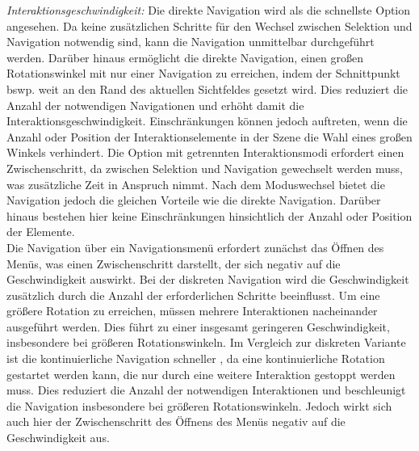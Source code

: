 \textit{Interaktionsgeschwindigkeit:}
Die direkte Navigation wird als die schnellste Option angesehen. Da keine zusätzlichen Schritte für den Wechsel zwischen Selektion und Navigation notwendig sind, kann die Navigation unmittelbar durchgeführt werden. Darüber hinaus ermöglicht die direkte Navigation, einen großen Rotationswinkel mit nur einer Navigation zu erreichen, indem der Schnittpunkt bswp. weit an den Rand des aktuellen Sichtfeldes gesetzt wird. Dies reduziert die Anzahl der notwendigen Navigationen und erhöht damit die Interaktionsgeschwindigkeit. Einschränkungen können jedoch auftreten, wenn die Anzahl oder Position der Interaktionselemente in der Szene die Wahl eines großen Winkels verhindert. Die Option mit getrennten Interaktionsmodi erfordert einen Zwischenschritt, da zwischen Selektion und Navigation gewechselt werden muss, was zusätzliche Zeit in Anspruch nimmt. Nach dem Moduswechsel bietet die Navigation jedoch die gleichen Vorteile wie die direkte Navigation. Darüber hinaus bestehen hier keine Einschränkungen hinsichtlich der Anzahl oder Position der Elemente. \\
Die Navigation über ein Navigationsmenü erfordert zunächst das Öffnen des Menüs, was einen Zwischenschritt darstellt, der sich negativ auf die Geschwindigkeit auswirkt. Bei der diskreten Navigation wird die Geschwindigkeit zusätzlich durch die Anzahl der erforderlichen Schritte beeinflusst. Um eine größere Rotation zu erreichen, müssen mehrere Interaktionen nacheinander ausgeführt werden. Dies führt zu einer insgesamt geringeren Geschwindigkeit, insbesondere bei größeren Rotationswinkeln. Im Vergleich zur diskreten Variante ist die kontinuierliche Navigation schneller \citep{10.1145/2159365.2159386}, da eine kontinuierliche Rotation gestartet werden kann, die nur durch eine weitere Interaktion gestoppt werden muss. Dies reduziert die Anzahl der notwendigen Interaktionen und beschleunigt die Navigation insbesondere bei größeren Rotationswinkeln. Jedoch wirkt sich auch hier der Zwischenschritt des Öffnens des Menüs negativ auf die Geschwindigkeit aus. 

